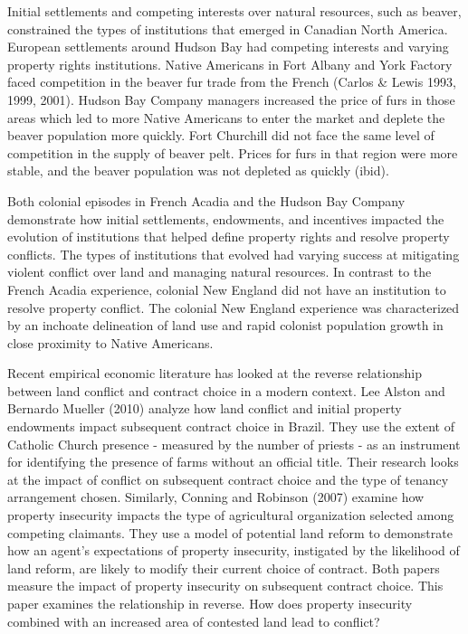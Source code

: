 \documentclass[11pt]{article}
\begin{document}
Initial settlements and competing interests over natural resources, such as beaver, constrained the types of institutions that emerged in Canadian North America. European settlements around Hudson Bay had competing interests and varying property rights institutions. Native Americans in Fort Albany and York Factory faced competition in the beaver fur trade from the French (Carlos \& Lewis 1993, 1999, 2001). Hudson Bay Company managers increased the price of furs in those areas which led to more Native Americans to enter the market and deplete the beaver population more quickly. Fort Churchill did not face the same level of competition in the supply of beaver pelt. Prices for furs in that region were more stable, and the beaver population was not depleted as quickly (ibid).

Both colonial episodes in French Acadia and the Hudson Bay Company demonstrate how initial settlements, endowments, and incentives impacted the evolution of institutions that helped define property rights and resolve property conflicts. The types of institutions that evolved had varying success at mitigating violent conflict over land and managing natural resources. In contrast to the French Acadia experience, colonial New England did not have an institution to resolve property conflict. The colonial New England experience was characterized by an inchoate delineation of land use and rapid colonist population growth in close proximity to Native Americans.

Recent empirical economic literature has looked at the reverse relationship between land conflict and contract choice in a modern context. %
Lee Alston and Bernardo Mueller (2010) analyze how land conflict and initial property endowments impact subsequent contract choice in Brazil. They use the extent of Catholic Church presence - measured by the number of priests - as an instrument for identifying the presence of farms without an official title. Their research looks at the impact of conflict on subsequent contract choice and the type of tenancy arrangement chosen. Similarly, Conning and Robinson (2007) examine how property insecurity impacts the type of agricultural organization selected among competing claimants. They use a model of potential land reform to demonstrate how an agent's expectations of property insecurity, instigated by the likelihood of land reform, are likely to modify their current choice of contract. Both papers measure the impact of property insecurity on subsequent contract choice. This paper examines the relationship in reverse. How does property insecurity combined with an increased area of contested land lead to conflict?
\end{document}
